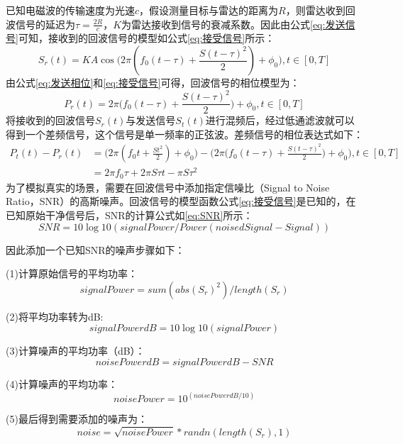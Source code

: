 已知电磁波的传输速度为光速$c$，假设测量目标与雷达的距离为$R$，则雷达收到回波信号的延迟为$\tau=\frac{2R}{c}$，$K$为雷达接收到信号的衰减系数\cite{matrosov2008assessment}。因此由公式\eqref{eq:发送信号}可知，接收到的回波信号的模型如公式\eqref{eq:接受信号}所示：
\begin{equation}
	\label{eq:接受信号}
	S_r(t) = KA \cos\big(2\pi (f_0(t - \tau)+\frac{S(t-\tau)^2}{2}) + \phi_0 \big), t \in [0,T]
\end{equation}
由公式\eqref{eq:发送相位}和\eqref{eq:接受信号}可得，回波信号的相位模型为：
\begin{equation}
	\label{eq:接收相位}
	P_r(t) = 2\pi \big(f_0(t-\tau)+\frac{S(t-\tau)^2}{2}\big)+ \phi_0, t\in [0,T]
\end{equation}
将接收到的回波信号$S_r(t)$与发送信号$S_t(t)$进行混频后，经过低通滤波就可以得到一个差频信号，这个信号是单一频率的正弦波。差频信号的相位表达式如下：
\begin{equation}
	\label{eq:中频}
	\begin{split}
		P_t(t) - P_r(t) &= \Big(2\pi(f_0t+\frac{St^2}{2})+\phi_0\Big) - \Big(2\pi \big(f_0(t-\tau)+\frac{S(t-\tau)^2}{2}\big)+ \phi_0\Big) , t\in [0,T]\\
		&=2\pi f_0\tau + 2\pi S \tau t - \pi S \tau^2
	\end{split}
\end{equation}
为了模拟真实的场景，需要在回波信号中添加指定信噪比（Signal to Noise Ratio，SNR）的高斯噪声\cite{luisier2010image}。回波信号的模型函数公式\eqref{eq:接受信号}是已知的，在已知原始干净信号后，SNR的计算公式如\eqref{eq:SNR}所示：
\begin{equation}
	\label{eq:SNR}
	SNR = 10\log10(signalPower / Power(noisedSignal- Signal))
\end{equation}

因此添加一个已知SNR的噪声步骤如下：
\par
(1)计算原始信号的平均功率：
\begin{equation}
	signalPower = sum(abs(S_r)^2) / length(S_r)
\end{equation}

(2)将平均功率转为dB:
\begin{equation}
	signalPowerdB = 10\log10(signalPower)
\end{equation}
\par
(3)计算噪声的平均功率（dB）：
\begin{equation}
	noisePowerdB = signalPowerdB -SNR
\end{equation}
\par
(4)计算噪声的平均功率：
\begin{equation}
noisePower = 10^{(noisePowerdB /10)}
\end{equation}
\par
(5)最后得到需要添加的噪声为：
\begin{equation}
noise = \sqrt{noisePower}*randn(length(S_r),1)
\end{equation}
